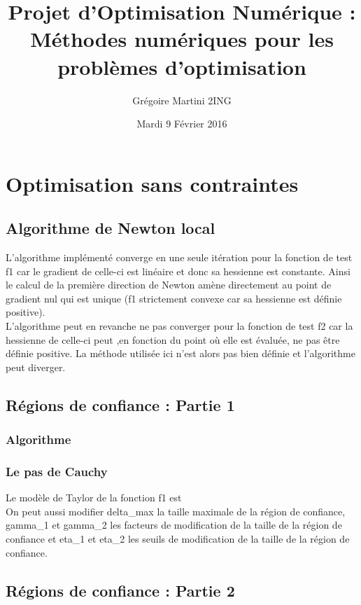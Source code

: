 \documentclass[a4paper,12pt]{article}
\title{Projet d'Optimisation Numérique : \\ \smallskip \Large Méthodes numériques pour les problèmes d'optimisation \\ \bigskip}
\author{Grégoire Martini 2ING}
\date{Mardi 9 Février 2016}
\begin{document}
\maketitle
\tableofcontents
\newpage

\section{Optimisation sans contraintes}

\subsection{Algorithme de Newton local}

L'algorithme implémenté converge en une seule itération pour la fonction de test f1 car le gradient de celle-ci est linéaire et donc sa hessienne est constante. Ainsi le calcul de la première direction de Newton amène directement au point de gradient nul qui est unique (f1 strictement convexe car sa hessienne est définie positive).\\

L'algorithme peut en revanche ne pas converger pour la fonction de test f2 car la hessienne de celle-ci peut ,en fonction du point où elle est évaluée, ne pas être définie positive. La méthode utilisée ici n'est alors pas bien définie et l'algorithme peut diverger.

\newpage
\subsection{Régions de confiance : Partie 1}
\subsubsection{Algorithme}
\subsubsection{Le pas de Cauchy}

Le modèle de Taylor de la fonction f1 est\\

On peut aussi modifier delta\_max la taille maximale de la région de confiance, gamma\_1 et gamma\_2 les facteurs de modification de la taille de la région de confiance et eta\_1 et eta\_2 les seuils de modification de la taille de la région de confiance.


\newpage
\subsection{Régions de confiance : Partie 2}
\end{document}
